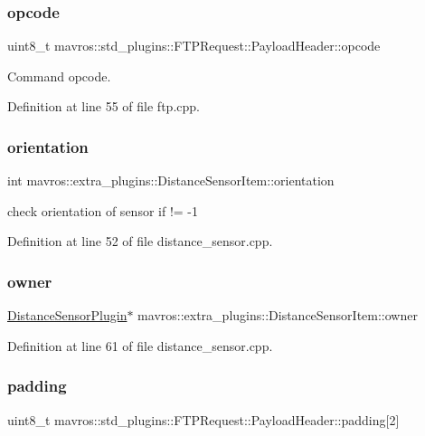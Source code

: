 \subsubsection{\texorpdfstring{opcode}{opcode}}
{\footnotesize\ttfamily uint8\+\_\+t mavros\+::std\+\_\+plugins\+::\+F\+T\+P\+Request\+::\+Payload\+Header\+::opcode}



Command opcode. 



Definition at line 55 of file ftp.\+cpp.

\mbox{\label{group__plugin_ga43f807eab20df3eafb28caf582e4b77b}} 
\subsubsection{\texorpdfstring{orientation}{orientation}}
{\footnotesize\ttfamily int mavros\+::extra\+\_\+plugins\+::\+Distance\+Sensor\+Item\+::orientation}



check orientation of sensor if != -\/1 



Definition at line 52 of file distance\+\_\+sensor.\+cpp.

\mbox{\label{group__plugin_ga4f45665ceec645c00b6692388d8c0d51}} 
\subsubsection{\texorpdfstring{owner}{owner}}
{\footnotesize\ttfamily \mbox{\hyperlink{classmavros_1_1extra__plugins_1_1DistanceSensorPlugin}{Distance\+Sensor\+Plugin}}$\ast$ mavros\+::extra\+\_\+plugins\+::\+Distance\+Sensor\+Item\+::owner}



Definition at line 61 of file distance\+\_\+sensor.\+cpp.

\mbox{\label{group__plugin_ga25e7938240c0066274c19308b8dbbf9a}} 
\subsubsection{\texorpdfstring{padding}{padding}}
{\footnotesize\ttfamily uint8\+\_\+t mavros\+::std\+\_\+plugins\+::\+F\+T\+P\+Request\+::\+Payload\+Header\+::padding\mbox{[}2\mbox{]}}




